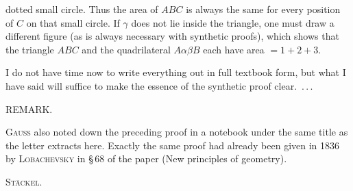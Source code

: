 dotted small circle. Thus the area of $ABC$ is always the same for every position of $C$ on that small circle. If $\gamma$ does not lie inside the triangle, one must draw a different figure (as is always necessary with synthetic proofs), which shows that the triangle $ABC$ and the quadrilateral $A\alpha\beta B$ each have area $=1+2+3$.

\begin{center}\end{center}

I do not have time now to write everything out in full textbook form, but what I have said will suffice to make the essence of the synthetic proof \mbox{clear. \mbox{.\,.\,.}}

\medskip

\begin{center}
REMARK.
\end{center}

\textsc{Gauss} also noted down the preceding proof in a notebook under the same title as the letter extracts here. Exactly the same proof had already been given in 1836 by \textsc{Lobachevsky} in \S\,68 of the paper  (New principles of geometry).

\begin{flushright}
\textsc{Stäckel}.
\end{flushright}
